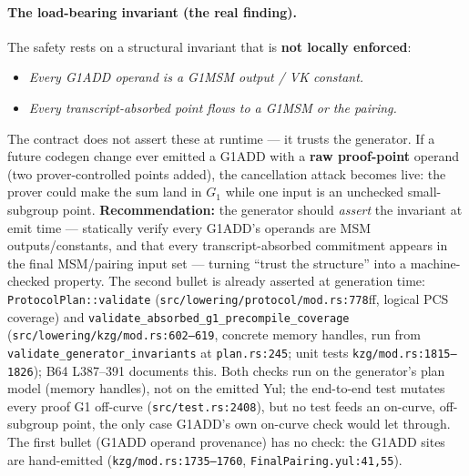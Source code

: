\paragraph{The load-bearing invariant (the real finding).}
The safety rests on a structural invariant that is \textbf{not
locally enforced}:
\begin{itemize}[leftmargin=1.4em,itemsep=2pt]
\item \emph{Every G1ADD operand is a G1MSM output / VK constant.}
\item \emph{Every transcript-absorbed point flows to a G1MSM or
  the pairing.}
\end{itemize}
The contract does not assert these at runtime --- it trusts the
generator. If a future codegen change ever emitted a G1ADD with a
\textbf{raw proof-point} operand (two prover-controlled points
added), the cancellation attack becomes live: the prover could
make the sum land in $G_1$ while one input is an unchecked
small-subgroup point. \textbf{Recommendation:} the generator
should \emph{assert} the invariant at emit time --- statically
verify every G1ADD's operands are MSM outputs/constants, and that
every transcript-absorbed commitment appears in the final
MSM/pairing input set --- turning ``trust the structure'' into a
machine-checked property.
 The second bullet is already asserted at
generation time: \texttt{ProtocolPlan::validate}
(\texttt{src/\allowbreak{}lowering/\allowbreak{}protocol/\allowbreak{}mod.rs:778}ff, logical PCS coverage)
and \texttt{validate\_\allowbreak{}absorbed\_\allowbreak{}g1\_\allowbreak{}precompile\_\allowbreak{}coverage}
(\texttt{src/\allowbreak{}lowering/\allowbreak{}kzg/\allowbreak{}mod.rs:602--619}, concrete memory
handles, run from \texttt{validate\_\allowbreak{}generator\_\allowbreak{}invariants} at
\texttt{plan.rs:245}; unit tests \texttt{kzg/\allowbreak{}mod.rs:1815--1826});
B64 L387--391 documents this. Both checks run on the
generator's plan model (memory handles), not on the emitted Yul;
the end-to-end test mutates every proof G1 off-curve
(\texttt{src/test.rs:2408}), but no test feeds an on-curve,
off-subgroup point, the only case G1ADD's own on-curve check would
let through. The first bullet (G1ADD operand
provenance) has no check: the G1ADD sites are hand-emitted
(\texttt{kzg/\allowbreak{}mod.rs:1735--1760}, \texttt{FinalPairing.yul:41,55}).

